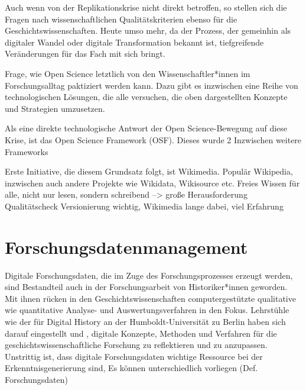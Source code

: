 Auch wenn von der Replikationskrise nicht direkt betroffen, so stellen sich die Fragen nach wissenschaftlichen Qualitätskriterien ebenso für die Geschichtswissenschaften. Heute umso mehr, da der Prozess, der gemeinhin als digitaler Wandel oder digitale Transformation bekannt ist, tiefgreifende Veränderungen für das Fach mit sich bringt.

Frage, wie Open Science letztlich von den Wissenschaftler*innen im Forschungsalltag paktiziert werden kann. Dazu gibt es inzwischen eine Reihe von technologischen Lösungen, die alle versuchen, die oben dargestellten Konzepte und Strategien umzusetzen.

Als eine direkte technologische Antwort der Open Science-Bewegung auf diese Krise, ist das Open Science Framework (OSF). Dieses wurde 2 Inzwischen weitere Frameworks  

Erste Initiative, die diesem Grundsatz folgt, ist Wikimedia. Populär Wikipedia, inzwischen auch andere Projekte wie Wikidata, Wikisource etc. Freies Wissen für alle, nicht nur lesen, sondern schreibend --> große Herausforderung Qualitätscheck Versionierung wichtig, Wikimedia lange dabei, viel Erfahrung

\section{Forschungsdatenmanagement}

Digitale Forschungsdaten, die im Zuge des Forschungsprozesses erzeugt werden, sind Bestandteil auch in der Forschungsarbeit von Historiker*innen geworden. Mit ihnen rücken in den Geschichtswissenschaften computergestützte qualitative wie quantitative Analyse- und Auswertungsverfahren in den Fokus. Lehrstühle wie der für Digital History an der Humboldt-Universität zu Berlin haben sich darauf eingestellt und , digitale Konzepte, Methoden und Verfahren für die geschichtswissenschaftliche Forschung zu reflektieren und zu anzupassen.  Unstrittig ist, dass digitale Forschungsdaten wichtige Ressource bei der Erkenntnisgenerierung sind, Es können unterschiedlich vorliegen (Def. Forschungsdaten)

